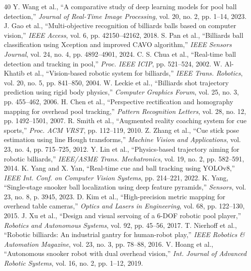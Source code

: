 \documentclass[conference]{IEEEtran}
\begin{document}

\begin{thebibliography}{40}
 Y. Wang et al., ``A comparative study of deep learning models for pool ball detection,'' \textit{Journal of Real-Time Image Processing}, vol. 20, no. 2, pp. 1--14, 2023.
 J. Gao et al., ``Multi-objective recognition of billiards balls based on computer vision,'' \textit{IEEE Access}, vol. 6, pp. 42150--42162, 2018.
 S. Pan et al., ``Billiards ball classification using Xception and improved CAVO algorithm,'' \textit{IEEE Sensors Journal}, vol. 24, no. 4, pp. 4892--4901, 2024.
 C. S. Chua et al., ``Real-time ball detection and tracking in pool,'' \textit{Proc. IEEE ICIP}, pp. 521--524, 2002.
 W. Al-Khatib et al., ``Vision-based robotic system for billiards,'' \textit{IEEE Trans. Robotics}, vol. 20, no. 5, pp. 841--850, 2004.
 W. Leckie et al., ``Billiards shot trajectory prediction using rigid body physics,'' \textit{Computer Graphics Forum}, vol. 25, no. 3, pp. 455--462, 2006.
 H. Chen et al., ``Perspective rectification and homography mapping for overhead pool tracking,'' \textit{Pattern Recognition Letters}, vol. 28, no. 12, pp. 1492--1501, 2007.
 R. Smith et al., ``Augmented reality coaching system for cue sports,'' \textit{Proc. ACM VRST}, pp. 112--119, 2010.
 Z. Zhang et al., ``Cue stick pose estimation using line Hough transforms,'' \textit{Machine Vision and Applications}, vol. 23, no. 4, pp. 715--725, 2012.
 Y. Lin et al., ``Physics-based trajectory aiming for robotic billiards,'' \textit{IEEE/ASME Trans. Mechatronics}, vol. 19, no. 2, pp. 582--591, 2014.
 K. Yang and X. Yan, ``Real-time cue and ball tracking using YOLOv8,'' \textit{IEEE Int. Conf. on Computer Vision Systems}, pp. 214--221, 2022.
 K. Yang, ``Single-stage snooker ball localization using deep feature pyramids,'' \textit{Sensors}, vol. 23, no. 8, p. 3945, 2023.
 D. Kim et al., ``High-precision metric mapping for overhead table cameras,'' \textit{Optics and Lasers in Engineering}, vol. 68, pp. 122--130, 2015.
 J. Xu et al., ``Design and visual servoing of a 6-DOF robotic pool player,'' \textit{Robotics and Autonomous Systems}, vol. 92, pp. 45--56, 2017.
 T. Nierhoff et al., ``Robotic billiards: An industrial gantry for human-robot play,'' \textit{IEEE Robotics \& Automation Magazine}, vol. 23, no. 3, pp. 78--88, 2016.
 V. Hoang et al., ``Autonomous snooker robot with dual overhead vision,'' \textit{Int. Journal of Advanced Robotic Systems}, vol. 16, no. 2, pp. 1--12, 2019.

\end{thebibliography}
\end{document}
